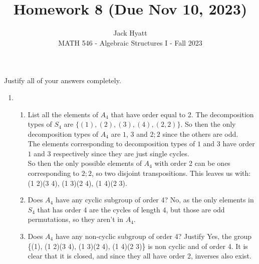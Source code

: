 \documentclass[12pt]{article}
\begin{document}
	
	
	
	\title{Homework 8 (Due Nov 10, 2023)}
	\author{Jack Hyatt\\ %
		MATH 546 - Algebraic Structures I - Fall 2023} 
	
	\maketitle
	
	Justify all of your answers completely.\\
	
	
	\medskip 
	
	\begin{enumerate}
		\item
		\begin{enumerate}
			\item List all the elements of $A_4$ that have order equal to 2.\m
			The decomposition types of $S_4$ are $\{(1),(2),(3),(4),(2,2)\}$. So then the only decomposition types of $A_4$ are $1$, $3$ and $2;2$ since the others are odd.\\
			The elements corresponding to decomposition types of $1$ and $3$ have order $1$ and $3$ respectively since they are just single cycles.\\
			So then the only possible elements of $A_4$ with order 2 can be ones corresponding to $2;2$, so two disjoint transpositions. This leaves us with:\\
			(1 2)(3 4), (1 3)(2 4), (1 4)(2 3).\\
			\item Does $A_4$ have any cyclic subgroup of order 4?\m
			No, as the only elements in $S_4$ that has order 4 are the cycles of length 4, but those are odd permutations, so they aren't in $A_4$.\\
			\item Does $A_4$ have any non-cyclic subgroup of order 4? Justify\m
			Yes, the group \{(1), (1 2)(3 4), (1 3)(2 4), (1 4)(2 3)\} is non cyclic and of order 4. It is clear that it is closed, and since they all have order 2, inverses also exist.
		\end{enumerate}
		

\end{enumerate}
\end{document}
